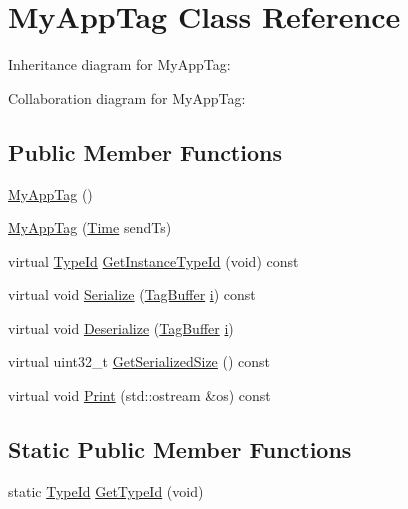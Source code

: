 \hypertarget{classMyAppTag}{}\section{My\+App\+Tag Class Reference}
\label{classMyAppTag}


Inheritance diagram for My\+App\+Tag\+:


Collaboration diagram for My\+App\+Tag\+:
\subsection*{Public Member Functions}
\begin{DoxyCompactItemize}
\item 
\hyperlink{classMyAppTag_aabaf71f9ca5c926ab4aef0f069109885}{My\+App\+Tag} ()
\item 
\hyperlink{classMyAppTag_a912d78bb3ec3af4f593e1681938432bf}{My\+App\+Tag} (\hyperlink{classns3_1_1Time}{Time} send\+Ts)
\item 
virtual \hyperlink{classns3_1_1TypeId}{Type\+Id} \hyperlink{classMyAppTag_afb73370d31e71848d8afc2ed8f1bc59a}{Get\+Instance\+Type\+Id} (void) const 
\item 
virtual void \hyperlink{classMyAppTag_ae70c7d0b718414be6d1ae2a560ac9453}{Serialize} (\hyperlink{classns3_1_1TagBuffer}{Tag\+Buffer} \hyperlink{lte__uplink__power__control_8m_a6f6ccfcf58b31cb6412107d9d5281426}{i}) const 
\item 
virtual void \hyperlink{classMyAppTag_aba106ef3425a0f740fc02f9ca2eac67a}{Deserialize} (\hyperlink{classns3_1_1TagBuffer}{Tag\+Buffer} \hyperlink{lte__uplink__power__control_8m_a6f6ccfcf58b31cb6412107d9d5281426}{i})
\item 
virtual uint32\+\_\+t \hyperlink{classMyAppTag_ac485f789e2139a7aacabd828e78640b8}{Get\+Serialized\+Size} () const 
\item 
virtual void \hyperlink{classMyAppTag_a6ccabab0183f8a7216855c902c25bc24}{Print} (std\+::ostream \&os) const 
\end{DoxyCompactItemize}
\subsection*{Static Public Member Functions}
\begin{DoxyCompactItemize}
\item 
static \hyperlink{classns3_1_1TypeId}{Type\+Id} \hyperlink{classMyAppTag_a83baa88d32aff2e137ef1cfa7ec82b86}{Get\+Type\+Id} (void)
\end{DoxyCompactItemize}
